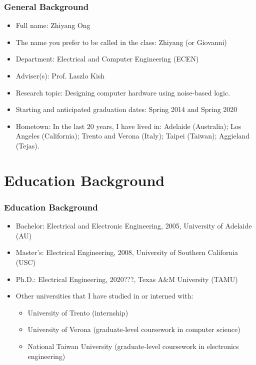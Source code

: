 \documentclass[xcolor={usenames,dvipsnames},hyperref={hyperindex,bookmarks}]{beamer}
\begin{document}
\frame
{
	\frametitle{General Background}

	\begin{itemize}
	\item Full name: Zhiyang Ong
	\item The name you prefer to be called in the class: Zhiyang (or Giovanni)
	\item Department: Electrical and Computer Engineering (ECEN)
	\item Adviser(s): Prof. Laszlo Kish
	\item Research topic: Designing computer hardware using noise-based logic.
	\item Starting and anticipated graduation dates: Spring 2014 and Spring 2020
	\item Hometown: In the last 20 years, I have lived in: Adelaide (Australia); Los Angeles (California); Trento and Verona (Italy); Taipei (Taiwan); Aggieland (Tejas).
	\end{itemize}
}





\section{Education Background}

\frame
{
	\frametitle{Education Background}

	\begin{itemize}
	\item Bachelor: Electrical and Electronic Engineering, 2005, University of Adelaide (AU)
	\item Master's: Electrical Engineering, 2008, University of Southern California (USC)
	\item Ph.D.: Electrical Engineering, 2020???, Texas A\&M University (TAMU)
	\item Other universities that I have studied in or interned with:
		\begin{itemize}
		\item University of Trento (internship)
		\item University of Verona (graduate-level coursework in computer science)
		\item National Taiwan University (graduate-level coursework in electronics engineering)
		\end{itemize}
	\end{itemize}
}
\end{document}
